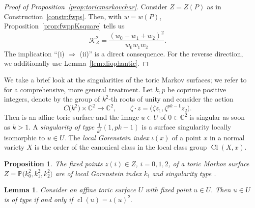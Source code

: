 \documentclass[pdftex]{sigma}
\newtheorem{lem}[thm]{Lemma}
\newtheorem{prop}[thm]{Proposition}
\theoremstyle{definition}
\def\CC{{\mathbb C}}
\def\PP{{\mathbb P}}
\DeclareMathOperator{\Cl}{Cl}
\DeclareMathOperator{\cl}{cl}
\begin{document}
\begin{proof}[Proof of Proposition~\ref{prop:toricmarkovchar}]
Consider $Z = Z(P)$ as in Construction~\ref{constr:fwps}.
Then, with $w=w(P)$, Proposition~\ref{prop:fwppKsquare}
tells us
\[
\mathcal{K}_Z^2
 =
\frac{(w_0+w_1+w_2)^2}{w_0w_1w_2}.
\]
The implication ``(i) $\Rightarrow$ (ii)''
is a direct consequence.
For the reverse direction, we additionally
use Lemma~\ref{lem:diophantic}.
\end{proof}

We take a brief look at the singularities of
the toric Markov surfaces; we refer
to~\cite[Sections~2 and~4]{HaPro} for a
comprehensive, more general treatment.
Let $k,p$ be coprime positive integers, denote
by \smash{$C\bigl(k^2\bigr) \subseteq \CC^*$} the group of $k^2$-th
roots of unity and consider the action
\[
C\bigl(k^2\bigr) \times \CC^2 \to \CC^2,
\qquad
\zeta \cdot z = \bigl(\zeta z_1, \zeta^{pk-1} z_2\bigr).
\]
Then \smash{$U := \CC^2/C\bigl(k^2\bigr)$} is an affine toric surface
and the image $u \in U$ of $0 \in \CC^2$ is singular
as soon as $k>1$.
A \emph{singularity of type} $\frac{1}{k^2}(1,pk-1)$
is a surface singularity locally isomorphic to $u \in U$.
The \emph{local Gorenstein index} $\iota(x)$ of a point
$x$ in a normal variety $X$ is the order of the canonical
class in the local class group $\Cl(X,x)$.


\begin{prop}
\label{prop:tmssingularities}
The fixed points $z(i) \in Z$, $i = 0,1,2$, of a toric
Markov surface $Z = \PP\bigl(k_0^2,k_1^2,k_2^2\bigr)$ are of
local Gorenstein index $k_i$ and singularity type
.
\end{prop}


\begin{lem}
\label{label:tsing}
Consider an affine toric surface $U$ with fixed
point $u \in U$.
Then $u \in U$ is of type 
if and only if $\cl(u) = \iota(u)^2$.
\end{lem}
\end{document}
